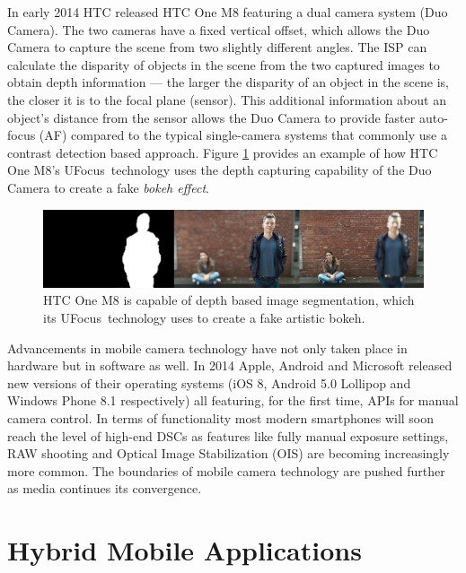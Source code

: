 \documentclass[thesis.tex]{subfiles}
\begin{document}
In early 2014 HTC released HTC One M8 featuring a dual camera system (Duo Camera). The two cameras have a fixed vertical offset, which allows the Duo Camera to capture the scene from two slightly different angles. The ISP can calculate the disparity of objects in the scene from the two captured images to obtain depth information --- the larger the disparity of an object in the scene is, the closer it is to the focal plane (sensor). This additional information about an object's distance from the sensor allows the Duo Camera to provide faster auto-focus (AF) compared to the typical single-camera systems that commonly use a contrast detection based approach. Figure \ref{figure:htc-ufocus} provides an example of how HTC One M8's UFocus\texttrademark\ technology uses the depth capturing capability of the Duo Camera to create a fake \emph{bokeh effect}.

\begin{figure}[h]
\centering \includegraphics[width=\textwidth]{images/htc-ufocus.jpg}
\caption{HTC One M8 is capable of depth based image segmentation, which its UFocus\texttrademark\ technology uses to create a fake artistic bokeh.\label{figure:htc-ufocus} \cite{htc_one_ufocus}}
\end{figure}

Advancements in mobile camera technology have not only taken place in hardware but in software as well. In 2014 Apple, Android and Microsoft released new versions of their operating systems (iOS 8, Android 5.0 Lollipop and Windows Phone 8.1 respectively) all featuring, for the first time, APIs for manual camera control. In terms of functionality most modern smartphones will soon reach the level of high-end DSCs as features like fully manual exposure settings, RAW shooting and Optical Image Stabilization (OIS) are becoming increasingly more common. The boundaries of mobile camera technology are pushed further as media continues its convergence.

\section{Hybrid Mobile Applications}
\label{section:hybrid_mobile_landscape}
\end{document}
